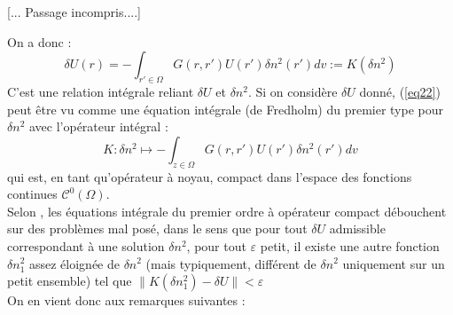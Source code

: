 \documentclass{article}
\begin{document}
[... Passage incompris....]

\bigskip
On a donc :
\begin{equation}\label{eq22}
	\delta U(r)=-\int_{r'\in\Omega} G(r,r')U(r')\delta n^2(r')dv := K(\delta n^2)
\end{equation}
C'est une relation intégrale reliant $\delta U$ et $\delta n^2$. Si on considère $\delta U$ donné, (\ref{eq22}) peut être vu comme une équation intégrale (de Fredholm) du premier type pour $\delta n^2$ avec l'opérateur intégral :
\[K : \delta n^2 \mapsto -\int_{z\in\Omega} G(r,r')U(r')\delta n^2(r') dv\]
qui est, en tant qu'opérateur à noyau, compact dans l'espace des fonctions continues $\mathscr{C}^0(\Omega)$. \\
Selon \cite{engl96regu}, les équations intégrale du premier ordre à opérateur compact débouchent sur des problèmes mal posé, dans le sens que pour tout $\delta U$ admissible correspondant à une solution $\delta n^2$, pour tout $\varepsilon$ petit, il existe une autre fonction $\delta n_1^2$ assez éloignée de $\delta n^2$ (mais typiquement, différent de $\delta n^2$ uniquement sur un petit ensemble) tel que $\|K(\delta n_1^2)-\delta U\|<\varepsilon$\\
On en vient donc aux remarques suivantes :
\end{document}
